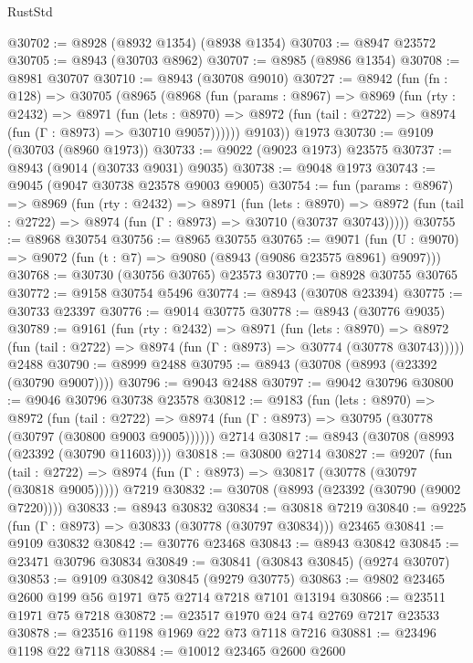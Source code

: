 \begin{lexlean}{RustStd}
\begin{coremodule}
@30702 := @8928 (@8932 @1354) (@8938 @1354)
@30703 := @8947 @23572
@30705 := @8943 (@30703 @8962)
@30707 := @8985 (@8986 @1354)
@30708 := @8981 @30707
@30710 := @8943 (@30708 @9010)
@30727 := @8942
    (fun (fn : @128) =>
    @30705
      (@8965
        (@8968
          (fun (params : @8967) =>
          @8969
            (fun (rty : @2432) =>
            @8971
              (fun (lets : @8970) =>
              @8972 (fun (tail : @2722) => @8974 (fun (Γ : @8973) => @30710 @9057))))))
        @9103))
    @1973
@30730 := @9109 (@30703 (@8960 @1973))
@30733 := @9022 (@9023 @1973) @23575
@30737 := @8943 (@9014 (@30733 @9031) @9035)
@30738 := @9048 @1973
@30743 := @9045 (@9047 @30738 @23578 @9003 @9005)
@30754 := fun (params : @8967) =>
  @8969
    (fun (rty : @2432) =>
    @8971
      (fun (lets : @8970) =>
      @8972 (fun (tail : @2722) => @8974 (fun (Γ : @8973) => @30710 (@30737 @30743)))))
@30755 := @8968 @30754
@30756 := @8965 @30755
@30765 := @9071
    (fun (U : @9070) => @9072 (fun (t : @7) => @9080 (@8943 (@9086 @23575 @8961) @9097)))
@30768 := @30730 (@30756 @30765) @23573
@30770 := @8928 @30755 @30765
@30772 := @9158 @30754 @5496
@30774 := @8943 (@30708 @23394)
@30775 := @30733 @23397
@30776 := @9014 @30775
@30778 := @8943 (@30776 @9035)
@30789 := @9161
    (fun (rty : @2432) =>
    @8971
      (fun (lets : @8970) =>
      @8972 (fun (tail : @2722) => @8974 (fun (Γ : @8973) => @30774 (@30778 @30743)))))
    @2488
@30790 := @8999 @2488
@30795 := @8943 (@30708 (@8993 (@23392 (@30790 @9007))))
@30796 := @9043 @2488
@30797 := @9042 @30796
@30800 := @9046 @30796 @30738 @23578
@30812 := @9183
    (fun (lets : @8970) =>
    @8972
      (fun (tail : @2722) =>
      @8974 (fun (Γ : @8973) => @30795 (@30778 (@30797 (@30800 @9003 @9005))))))
    @2714
@30817 := @8943 (@30708 (@8993 (@23392 (@30790 @11603))))
@30818 := @30800 @2714
@30827 := @9207
    (fun (tail : @2722) => @8974 (fun (Γ : @8973) => @30817 (@30778 (@30797 (@30818 @9005)))))
    @7219
@30832 := @30708 (@8993 (@23392 (@30790 (@9002 @7220))))
@30833 := @8943 @30832
@30834 := @30818 @7219
@30840 := @9225 (fun (Γ : @8973) => @30833 (@30778 (@30797 @30834))) @23465
@30841 := @9109 @30832
@30842 := @30776 @23468
@30843 := @8943 @30842
@30845 := @23471 @30796 @30834
@30849 := @30841 (@30843 @30845) (@9274 @30707)
@30853 := @9109 @30842 @30845 (@9279 @30775)
@30863 := @9802 @23465 @2600 @199 @56 @1971 @75 @2714 @7218 @7101 @13194
@30866 := @23511 @1971 @75 @7218
@30872 := @23517 @1970 @24 @74 @2769 @7217 @23533
@30878 := @23516 @1198 @1969 @22 @73 @7118 @7216
@30881 := @23496 @1198 @22 @7118
@30884 := @10012 @23465 @2600 @2600

\end{coremodule}
\end{lexlean}
